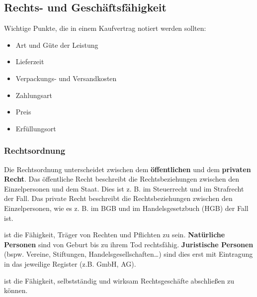 

\subsection{Rechts- und Geschäftsfähigkeit}

Wichtige Punkte, die in einem Kaufvertrag notiert werden sollten:

\begin{itemize}
\setlength\itemsep{0em}
	\item Art und Güte der Leistung
	\item Lieferzeit
	\item Verpackungs- und Versandkosten
	\item Zahlungsart
	\item Preis
	\item Erfüllungsort
\end{itemize}

\subsubsection{Rechtsordnung}
Die Rechtsordnung unterscheidet zwischen dem {\bf öffentlichen} und dem {\bf privaten Recht}. Das öffentliche Recht beschreibt die Rechtsbeziehungen zwischen den Einzelpersonen und dem Staat. Dies ist z. B. im Steuerrecht und im Strafrecht der Fall. Das private Recht beschreibt die Rechtsbeziehungen zwischen den Einzelpersonen, wie es z. B. im BGB und im Handelsgesetzbuch (HGB) der Fall ist.\newline

 ist die Fähigkeit, Träger von Rechten und Pflichten zu sein. {\bf Natürliche Personen} sind von Geburt bis zu ihrem Tod rechtsfähig. {\bf Juristische Personen} (bspw. Vereine, Stiftungen, Handelsgesellschaften\dots ) sind dies erst mit Eintragung in das jeweilige Register (z.B. GmbH, AG).\newline

 ist die Fähigkeit, selbstständig und wirksam Rechtsgeschäfte abschließen zu können.

